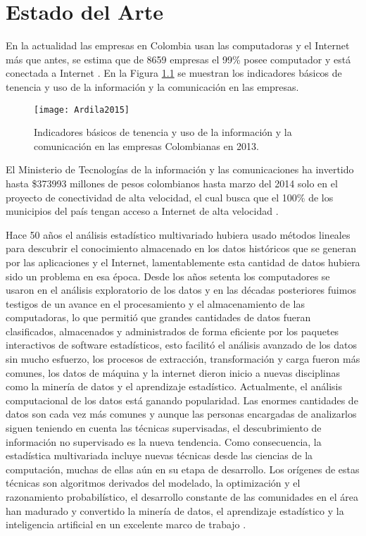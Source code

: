 \chapter{Estado del Arte}

En la actualidad las empresas en Colombia usan las computadoras y el Internet más que antes, se estima que de 8659 empresas el 99\% posee computador y está conectada a Internet \cite{Ardila2015}. En la Figura \ref{Ardila2015} se muestran los indicadores básicos de tenencia y uso de la información y la comunicación en las empresas. 
\begin{figure}[ht]
\centering
\texttt{[image: Ardila2015]}
\caption{Indicadores básicos de tenencia y uso de la información y la comunicación en las empresas Colombianas en 2013.}
\label{Ardila2015}
\end{figure}
	
El Ministerio de Tecnologías de la información y las comunicaciones ha invertido hasta \$373993 millones de pesos colombianos hasta marzo del 2014 solo en el proyecto de conectividad de alta velocidad, el cual busca que el 100\% de los municipios del país tengan acceso a Internet de alta velocidad \cite{Comunicaciones2014}. 

Hace 50 años el análisis estadístico multivariado hubiera usado métodos lineales para descubrir el conocimiento almacenado en los datos históricos que se generan por las aplicaciones y el Internet, lamentablemente esta cantidad de datos hubiera sido un problema en esa época. Desde los años setenta los computadores se usaron en el análisis exploratorio de los datos y en las décadas posteriores fuimos testigos de un avance en el procesamiento y el almacenamiento de las computadoras, lo que permitió que grandes cantidades de datos fueran clasificados, almacenados y administrados de forma eficiente por los paquetes interactivos de software estadísticos, esto facilitó el análisis avanzado de los datos sin mucho esfuerzo, los procesos de extracción, transformación y carga fueron más comunes, los datos de máquina y la internet dieron inicio a nuevas disciplinas como la minería de datos y el aprendizaje estadístico. Actualmente, el análisis computacional de los datos está ganando popularidad. Las enormes cantidades de datos son cada vez más comunes y aunque las personas encargadas de analizarlos siguen teniendo en cuenta las técnicas supervisadas,  el descubrimiento de información no supervisado es la nueva tendencia. Como consecuencia, la estadística multivariada incluye nuevas técnicas desde las ciencias de la computación, muchas de ellas aún en su etapa de desarrollo. Los orígenes de estas técnicas son algoritmos derivados del modelado, la optimización y el razonamiento probabilístico, el desarrollo constante de las comunidades en el área han madurado y convertido la minería de datos, el aprendizaje estadístico y la inteligencia artificial en un excelente marco de trabajo \cite{Hastie2009}.

